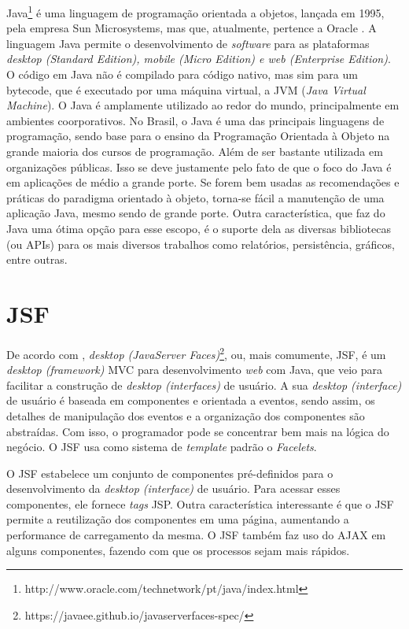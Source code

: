 Java\footnote{http://www.oracle.com/technetwork/pt/java/index.html} é uma linguagem de programação orientada a objetos, lançada em 1995, pela empresa Sun Microsystems, mas que, atualmente, pertence a Oracle \cite{Deitel2009}. A linguagem Java permite o desenvolvimento de \textit{software} para as plataformas \textit{desktop (Standard Edition), mobile (Micro Edition) e \textit{web} (Enterprise Edition)}. O código em Java não é compilado para código nativo, mas sim para um bytecode, que é executado por uma máquina virtual, a JVM (\textit{Java Virtual Machine}). 
O Java é amplamente utilizado ao redor do mundo, principalmente em ambientes coorporativos. No Brasil, o Java é uma das principais linguagens de programação, sendo base para o ensino da Programação Orientada à Objeto na grande maioria dos cursos de programação. Além de ser bastante utilizada em organizações públicas. Isso se deve justamente pelo fato de que o foco do Java é em aplicações de médio a grande porte. Se forem bem usadas as recomendações e práticas do paradigma orientado à objeto, torna-se fácil a manutenção de uma aplicação Java, mesmo sendo de grande porte. Outra característica, que faz do Java uma ótima opção para esse escopo, é o suporte dela as diversas bibliotecas (ou APIs) para os mais diversos trabalhos como relatórios, persistência, gráficos, entre outras. 

\section{JSF}
\label{sec:embasamentoTeoricoJSF}

De acordo com , \textit{desktop (JavaServer Faces)}\footnote{https://javaee.github.io/javaserverfaces-spec/}, ou, mais comumente, JSF, é um \textit{desktop (framework)} MVC para desenvolvimento \textit{web} com Java, que veio para facilitar a construção de \textit{desktop (interfaces)} de usuário. A sua \textit{desktop (interface)} de usuário é baseada em componentes e orientada a eventos, sendo assim, os detalhes de manipulação dos eventos e a organização dos componentes são abstraídas. Com isso, o programador pode se concentrar bem mais na lógica do negócio. O JSF usa como sistema de \textit{template} padrão o \textit{Facelets}.

O JSF estabelece um conjunto de componentes pré-definidos para o desenvolvimento da \textit{desktop (interface)} de usuário. Para acessar esses componentes, ele fornece \textit{tags} JSP. Outra característica interessante é que o JSF permite a reutilização dos componentes em uma página, aumentando a performance de carregamento da mesma. O JSF também faz uso do AJAX em alguns componentes, fazendo com que os processos sejam mais rápidos.

